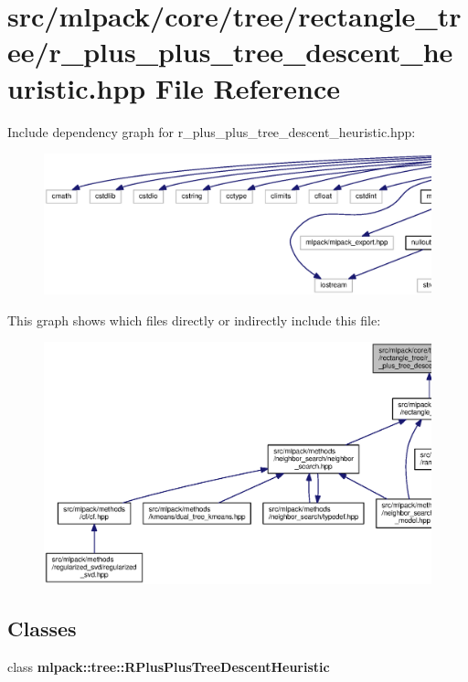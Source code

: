 \section{src/mlpack/core/tree/rectangle\+\_\+tree/r\+\_\+plus\+\_\+plus\+\_\+tree\+\_\+descent\+\_\+heuristic.hpp File Reference}
\label{r__plus__plus__tree__descent__heuristic_8hpp}
Include dependency graph for r\+\_\+plus\+\_\+plus\+\_\+tree\+\_\+descent\+\_\+heuristic.\+hpp\+:
\nopagebreak
\begin{figure}[H]
\begin{center}
\leavevmode
\includegraphics[width=350pt]{r__plus__plus__tree__descent__heuristic_8hpp__incl}
\end{center}
\end{figure}
This graph shows which files directly or indirectly include this file\+:
\nopagebreak
\begin{figure}[H]
\begin{center}
\leavevmode
\includegraphics[width=350pt]{r__plus__plus__tree__descent__heuristic_8hpp__dep__incl}
\end{center}
\end{figure}
\subsection*{Classes}
\begin{DoxyCompactItemize}
\item 
class {\bf mlpack\+::tree\+::\+R\+Plus\+Plus\+Tree\+Descent\+Heuristic}
\end{DoxyCompactItemize}
